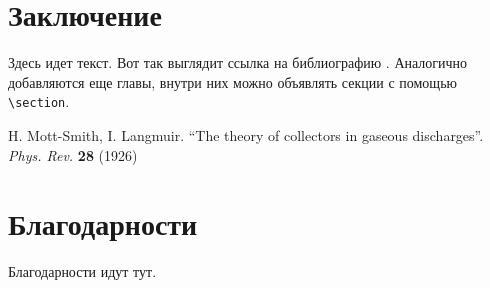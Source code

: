 \documentclass{mipt-thesis-ms}
\begin{document}
\chapter{Заключение}

Здесь идет текст. Вот так выглядит ссылка на библиографию \cite{langmuir26}. Аналогично добавляются еще главы, внутри них можно объявлять секции с помощью \verb|\section|.


\backmatter

\begin{thebibliography}{99}
        H. Mott-Smith, I. Langmuir. ``The theory of collectors in gaseous discharges''. \emph{Phys. Rev.} \textbf{28} (1926)
\end{thebibliography}

\chapter{Благодарности}

Благодарности идут тут.
\end{document}
